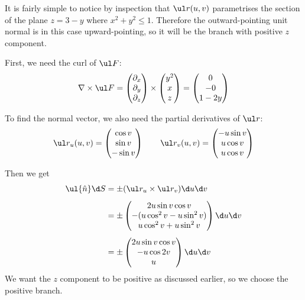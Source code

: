 \documentclass[a4paper]{article}
\begin{document}
It is fairly simple to notice by inspection that $\ul r(u, v)$ parametrises the section of the plane $z = 3-y$ where $x^2 + y^2 \le 1$. Therefore the outward-pointing unit normal is in this case upward-pointing, so it will be the branch with positive $z$ component.

First, we need the curl of $\ul F$: $$\nabla \times \ul F = \begin{pmatrix} \partial_x \\ \partial_y \\ \partial_z \end{pmatrix} \times \begin{pmatrix} y^2 \\ x \\ z \end{pmatrix} = \begin{pmatrix} 0 \\ -0 \\ 1 - 2y \end{pmatrix}$$

To find the normal vector, we also need the partial derivatives of $\ul r$: $$\ul r_u(u, v) = \begin{pmatrix} \cos v \\ \sin v \\ - \sin v \end{pmatrix} \qquad \ul r_v(u, v) = \begin{pmatrix} -u \sin v \\ u \cos v \\ u \cos v \end{pmatrix}$$

Then we get \begin{align*}
\ul{\hat n} \d S &= \pm (\ul r_u \times \ul r_v) \d u \d v\\[1ex]
&= \pm \begin{pmatrix} 2u \sin v \cos v \\ -(u \cos^2 v - u \sin^2 v) \\ u \cos^2 v + u \sin^2 v \end{pmatrix} \d u \d v\\[1ex]
&= \pm \begin{pmatrix} 2u \sin v \cos v \\ -u \cos 2v \\ u \end{pmatrix} \d u \d v
\end{align*}
We want the $z$ component to be positive as discussed earlier, so we choose the positive branch.
\end{document}
